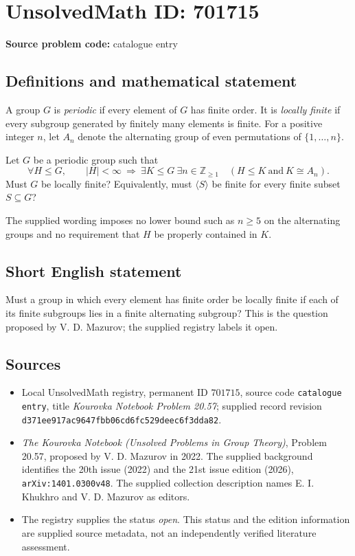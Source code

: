 \documentclass[11pt]{article}
\newcommand{\Z}{\mathbb{Z}}
\begin{document}
\section*{UnsolvedMath ID: 701715}
\textbf{Source problem code:} catalogue entry
\subsection{Definitions and mathematical statement}
A group \(G\) is \emph{periodic} if every element of \(G\) has finite order. It is \emph{locally finite} if every subgroup generated by finitely many elements is finite. For a positive integer \(n\), let \(A_n\) denote the alternating group of even permutations of \(\{1,\ldots,n\}\).

Let \(G\) be a periodic group such that
\[
\forall H\leq G,\qquad |H|<\infty\ \Longrightarrow\ \exists K\leq G\ \exists n\in\Z_{\geq1}\quad (H\leq K\ \text{and}\ K\cong A_n).
\]
Must \(G\) be locally finite? Equivalently, must \(\langle S\rangle\) be finite for every finite subset \(S\subseteq G\)?

The supplied wording imposes no lower bound such as \(n\geq5\) on the alternating groups and no requirement that \(H\) be properly contained in \(K\).
\subsection{Short English statement}
Must a group in which every element has finite order be locally finite if each of its finite subgroups lies in a finite alternating subgroup? This is the question proposed by V. D. Mazurov; the supplied registry labels it open.
\subsection{Sources}
\begin{itemize}
\item Local UnsolvedMath registry, permanent ID \(701715\), source code \texttt{catalogue entry}, title \emph{Kourovka Notebook Problem 20.57}; supplied record revision \texttt{d371ee917ac9647fbb06cd6fc529deec6f3dda82}.
\item \emph{The Kourovka Notebook (Unsolved Problems in Group Theory)}, Problem 20.57, proposed by V. D. Mazurov in 2022. The supplied background identifies the 20th issue (2022) and the 21st issue edition (2026), \texttt{arXiv:1401.0300v48}. The supplied collection description names E. I. Khukhro and V. D. Mazurov as editors.
\item The registry supplies the status \emph{open}. This status and the edition information are supplied source metadata, not an independently verified literature assessment.
\end{itemize}
\end{document}

